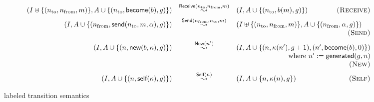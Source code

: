 \begin{figure*}[t]
  \begin{displaymath}
    \begin{array}{rcl}
      (I \uplus \{(n_{\textrm{to}}, n_{\textrm{from}}, m)\}, A \cup \{(n_{\textrm{to}}, \textsf{become}(b), g)\}) &
      \overset{\textsf{Receive}(n_{\textrm{to}}, n_{\textrm{from}}, m)}{\leadsto} &
      (I, A \cup \{(n_{\textrm{to}}, b(m), g)\})
      \hfill \textsc{(Receive)} \\[1ex]

      (I, A \cup \{(n_{\textrm{from}}, \textsf{send}(n_{\textrm{to}}, m, \alpha), g)\}) &
      \overset{\textsf{Send}(n_{\textrm{from}}, n_{\textrm{to}}, m)}{\leadsto} &
      (I \uplus \{(n_{\textrm{to}}, n_{\textrm{from}}, m)\}, A \cup \{(n_{\textrm{from}}, \alpha, g)\}) \\
      & & \hfill \textsc{(Send)} \\[1ex]

      (I, A \cup \{(n, \textsf{new}(b, \kappa), g)\}) &
      \overset{\textsf{New}(n')}{\leadsto} &
      (I, A \cup \{(n, \kappa(n'), g + 1), (n', \textsf{become}(b), 0)\}) \\
      & & \hfill \textrm{where}\ n' := \textsf{generated}(g, n) \\
      & & \hfill \textsc{(New)} \\[1ex]

      (I, A \cup \{(n, \textsf{self}(\kappa), g)\}) &
      \overset{\textsf{Self}(n)}{\leadsto} &
      (I, A \cup \{n, \kappa(n), g\})
      \hfill \textsc{(Self)}
    \end{array}
  \end{displaymath}
  \caption{labeled transition semantics}\label{fig:semantics}
\end{figure*}
